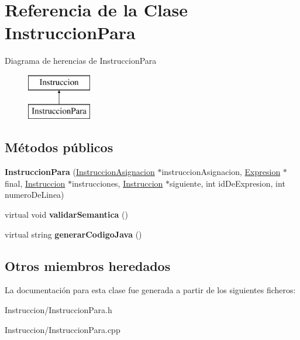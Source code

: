 \hypertarget{class_instruccion_para}{\section{Referencia de la Clase Instruccion\-Para}
\label{class_instruccion_para}
}
Diagrama de herencias de Instruccion\-Para\begin{figure}[H]
\begin{center}
\leavevmode
\includegraphics[height=2.000000cm]{class_instruccion_para}
\end{center}
\end{figure}
\subsection*{Métodos públicos}
\begin{DoxyCompactItemize}
\item 
\hypertarget{class_instruccion_para_ab17f0a2666c007f8628e64e2e9565706}{{\bfseries Instruccion\-Para} (\hyperlink{class_instruccion_asignacion}{Instruccion\-Asignacion} $\ast$instruccion\-Asignacion, \hyperlink{class_expresion}{Expresion} $\ast$final, \hyperlink{class_instruccion}{Instruccion} $\ast$instrucciones, \hyperlink{class_instruccion}{Instruccion} $\ast$siguiente, int id\-De\-Expresion, int numero\-De\-Linea)}\label{class_instruccion_para_ab17f0a2666c007f8628e64e2e9565706}

\item 
\hypertarget{class_instruccion_para_aa33221010c58fa12a4bd0ef8326e61cd}{virtual void {\bfseries validar\-Semantica} ()}\label{class_instruccion_para_aa33221010c58fa12a4bd0ef8326e61cd}

\item 
\hypertarget{class_instruccion_para_a793b98134eef15c55703fc4183c196b3}{virtual string {\bfseries generar\-Codigo\-Java} ()}\label{class_instruccion_para_a793b98134eef15c55703fc4183c196b3}

\end{DoxyCompactItemize}
\subsection*{Otros miembros heredados}


La documentación para esta clase fue generada a partir de los siguientes ficheros\-:\begin{DoxyCompactItemize}
\item 
Instruccion/Instruccion\-Para.\-h\item 
Instruccion/Instruccion\-Para.\-cpp\end{DoxyCompactItemize}
